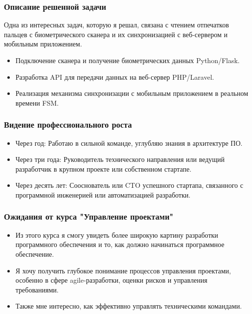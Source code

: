 \documentclass{beamer}
\begin{document}
\begin{frame}[fragile]
  \frametitle{Описание решенной задачи}
  Одна из интересных задач, которую я решал, связана с чтением отпечатков пальцев с биометрического сканера и их синхронизацией с веб-сервером и мобильным приложением.
  \begin{itemize}
    \item Подключение сканера и получение биометрических данных Python/Flask.
    \item Разработка API для передачи данных на веб-сервер PHP/Laravel.
    \item Реализация механизма синхронизации с мобильным приложением в реальном времени FSM.
  \end{itemize}
\end{frame}


\begin{frame}[fragile]
  \frametitle{Видение профессионального роста}
  \begin{itemize}
    \item Через год: Работаю в сильной команде, углубляю знания в архитектуре ПО.
    \item Через три года: Руководитель технического направления или ведущий разработчик в крупном проекте или собственном стартапе.
    \item Через десять лет: Сооснователь или CTO успешного стартапа, связанного с программной инженерией или автоматизацией разработки.
  \end{itemize}
\end{frame}


\begin{frame}
  \frametitle{Ожидания от курса "Управление проектами"}
  \begin{itemize}
    \item Из этого курса я смогу увидеть более широкую картину разработки программного обеспечения и то, как должно начинаться программное обеспечение.
    \item Я хочу получить глубокое понимание процессов управления проектами, особенно в сфере agile-разработки, оценки рисков и управления требованиями.
    \item Также мне интересно, как эффективно управлять техническими командами.
  \end{itemize}
\end{frame}
\end{document}
